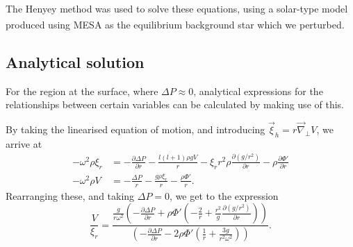 \documentclass[a0,portrait]{a0poster}
\begin{document}
\begin{multicols}{2}
\begin{tcolorbox}[colframe=black,colback=blue!10!white]
The Henyey method \textsuperscript{\cite{Henyey1964}} was used to solve these equations, using a solar-type model produced using MESA \textsuperscript{\cite{Paxton2018}} as the equilibrium background star which we perturbed.


\subsection*{Analytical solution}

For the region at the surface, where $\Delta P \approx 0$, analytical expressions for the relationships between certain variables can be calculated by making use of this.

By taking the linearised equation of motion, and introducing $\vec{\xi}_{h} = r \vec{\nabla}_{\perp} V$, we arrive at
\small
\begin{align}
- \omega^{2} \rho \xi_{r} & = - \frac{\partial \Delta P}{\partial r} - \frac{l (l+1) \rho g V}{r} - \xi_{r} r^{2} \rho \frac{\partial \left( g / r^{2} \right) }{\partial r} - \rho \frac{\partial \Phi'}{\partial r}
\\
- \omega^{2} \rho V & = - \frac{\Delta P}{r}  -  \frac{g \rho \xi_{r}}{r} - \frac{\rho \Phi'}{r}.
\end{align}
\normalsize
Rearranging these, and taking $\Delta P = 0$, we get to the expression
\small
\begin{equation}
\label{eq:V_over_xi_r}
\frac{V}{\xi_{r}} = \frac{ \frac{g}{r \omega^{2}} \left( - \frac{\partial \Delta P}{\partial r} + \rho \Phi' \left( -\frac{2}{r} + \frac{r^{2}}{g} \frac{\partial \left( g/r^{2} \right)}{\partial r} \right) \right)  }{\left( - \frac{\partial \Delta P}{\partial r} - 2 \rho \Phi' \left( \frac{1}{r} + \frac{3 g}{r^{2} \omega^{2}} \right) \right) }.
\end{equation}
\normalsize

\vspace{0.5cm}

\end{tcolorbox}




\begin{tcolorbox}[colframe=black,colback=blue!10!white]


\end{tcolorbox}
\end{multicols}
\end{document}
